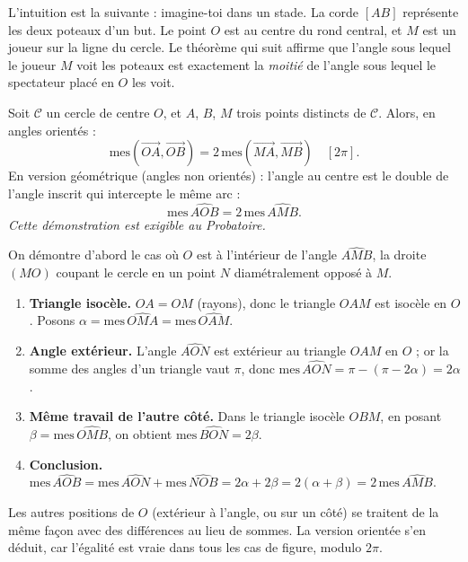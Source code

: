 \documentclass[11pt]{article}
\begin{document}
L'intuition est la suivante : imagine-toi dans un stade. La corde $[AB]$ représente les deux poteaux d'un but. Le point $O$ est au centre du rond central, et $M$ est un joueur sur la ligne du cercle. Le théorème qui suit affirme que l'angle sous lequel le joueur $M$ voit les poteaux est exactement la \emph{moitié} de l'angle sous lequel le spectateur placé en $O$ les voit.

\begin{propriete}
Soit $\mathcal{C}$ un cercle de centre $O$, et $A$, $B$, $M$ trois points distincts de $\mathcal{C}$. Alors, en angles orientés :
\[ \text{mes}(\overrightarrow{OA}, \overrightarrow{OB}) = 2\,\text{mes}(\overrightarrow{MA}, \overrightarrow{MB}) \quad [2\pi]. \]
En version géométrique (angles non orientés) : l'angle au centre est le double de l'angle inscrit qui intercepte le même arc :
\[ \text{mes}\,\widehat{AOB} = 2\,\text{mes}\,\widehat{AMB}. \]
\emph{Cette démonstration est exigible au Probatoire.}
\end{propriete}

\begin{experience}
On démontre d'abord le cas où $O$ est à l'intérieur de l'angle $\widehat{AMB}$, la droite $(MO)$ coupant le cercle en un point $N$ diamétralement opposé à $M$.
\begin{enumerate}
\item \textbf{Triangle isocèle.} $OA = OM$ (rayons), donc le triangle $OAM$ est isocèle en $O$. Posons $\alpha = \text{mes}\,\widehat{OMA} = \text{mes}\,\widehat{OAM}$.
\item \textbf{Angle extérieur.} L'angle $\widehat{AON}$ est extérieur au triangle $OAM$ en $O$ ; or la somme des angles d'un triangle vaut $\pi$, donc $\text{mes}\,\widehat{AON} = \pi - (\pi - 2\alpha) = 2\alpha$.
\item \textbf{Même travail de l'autre côté.} Dans le triangle isocèle $OBM$, en posant $\beta = \text{mes}\,\widehat{OMB}$, on obtient $\text{mes}\,\widehat{BON} = 2\beta$.
\item \textbf{Conclusion.} $\text{mes}\,\widehat{AOB} = \text{mes}\,\widehat{AON} + \text{mes}\,\widehat{NOB} = 2\alpha + 2\beta = 2(\alpha + \beta) = 2\,\text{mes}\,\widehat{AMB}$.
\end{enumerate}
Les autres positions de $O$ (extérieur à l'angle, ou sur un côté) se traitent de la même façon avec des différences au lieu de sommes. La version orientée s'en déduit, car l'égalité est vraie dans tous les cas de figure, modulo $2\pi$.
\end{experience}
\end{document}
